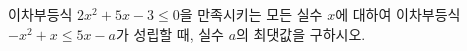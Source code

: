 \hspace*{2mm}\begin{minipage}[t]{\dimexpr\linewidth-2mm\relax}\vspace{0pt}
이차부등식 $2x^2+5x-3\le 0$을 만족시키는 모든 실수 $x$에 대하여 이차부등식 $-x^2+x\le 5x-a$가 성립할 때, 실수 $a$의 최댓값을 구하시오.\end{minipage}
